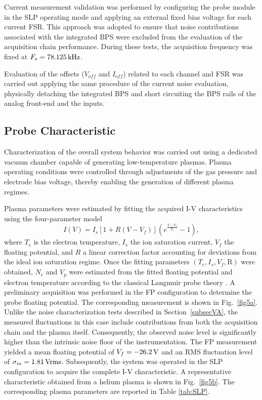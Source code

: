Current measurement validation was performed by configuring the probe module in the SLP operating mode and applying an external fixed bias voltage for each current FSR. This approach was adopted to ensure that noise contributions associated with the integrated BPS were excluded from the evaluation of the acquisition chain performance. During these tests, the acquisition frequency was fixed at $F_s=78.125 \, \mathrm{kHz}$.

Evaluation of the offsets ($V_{off}$ and $I_{off}$) related to each channel and FSR was carried out applying the same procedure of the current noise evaluation, physically detaching the integrated BPS and short circuiting the BPS rails of the analog front-end and the inputs.



\subsection{Probe Characteristic} \label{subsecVB}

Characterization of the overall system behavior was carried out using a dedicated vacuum chamber capable of generating low-temperature plasmas. Plasma operating conditions were controlled through adjustments of the gas pressure and electrode bias voltage, thereby enabling the generation of different plasma regimes. 

Plasma parameters were estimated by fitting the acquired I-V characteristics using the four-parameter model
\begin{equation}
	I(V)=I_s\left[1+R(V-V_f)\right] \left(e^{\frac{V-V_f}{T_e}}-1\right),
	\label{eq:model_slp}
\end{equation}
where $T_e$ is the electron temperature, $I_s$ the ion saturation current, $V_f$ the floating potential, and $R$ a linear correction factor accounting for deviations from the ideal ion saturation regime. Once the fitting parameters $(T_e, I_s, V_f, \mathrm{R})$ were obtained, $N_e$ and $V_p$ were estimated from the fitted floating potential and electron temperature according to the classical Langmuir probe theory \cite{Chen}. A preliminary acquisition was performed in the FP configuration to determine the probe floating potential. The corresponding measurement is shown in Fig.~\ref{fig5a}. Unlike the noise characterization tests described in Section~\ref{subsecVA}, the measured fluctuations in this case include contributions from both the acquisition chain and the plasma itself. Consequently, the observed noise level is significantly higher than the intrinsic noise floor of the instrumentation. The FP measurement yielded a mean floating potential of $V_f=-26.2 \, \mathrm{V}$ and an RMS fluctuation level of $\sigma_m=1.81 \, \mathrm{Vrms}$. Subsequently, the system was operated in the SLP configuration to acquire the complete I-V characteristic. A representative characteristic obtained from a helium plasma is shown in Fig.~\ref{fig5b}. The corresponding plasma parameters are reported in Table \ref{tab:SLP}.


